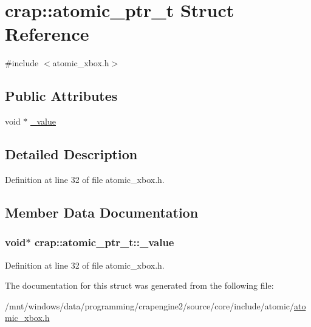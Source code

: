 \hypertarget{structcrap_1_1atomic__ptr__t}{}\section{crap\+:\+:atomic\+\_\+ptr\+\_\+t Struct Reference}
\label{structcrap_1_1atomic__ptr__t}


{\ttfamily \#include $<$atomic\+\_\+xbox.\+h$>$}

\subsection*{Public Attributes}
\begin{DoxyCompactItemize}
\item 
void $\ast$ \hyperlink{structcrap_1_1atomic__ptr__t_aaadad78152d53398555fb40cc7276d72}{\+\_\+value}
\end{DoxyCompactItemize}


\subsection{Detailed Description}


Definition at line 32 of file atomic\+\_\+xbox.\+h.



\subsection{Member Data Documentation}
\hypertarget{structcrap_1_1atomic__ptr__t_aaadad78152d53398555fb40cc7276d72}{}
\subsubsection[{\+\_\+value}]{\setlength{\rightskip}{0pt plus 5cm}void$\ast$ crap\+::atomic\+\_\+ptr\+\_\+t\+::\+\_\+value}\label{structcrap_1_1atomic__ptr__t_aaadad78152d53398555fb40cc7276d72}


Definition at line 32 of file atomic\+\_\+xbox.\+h.



The documentation for this struct was generated from the following file\+:\begin{DoxyCompactItemize}
\item 
/mnt/windows/data/programming/crapengine2/source/core/include/atomic/\hyperlink{atomic__xbox_8h}{atomic\+\_\+xbox.\+h}\end{DoxyCompactItemize}
